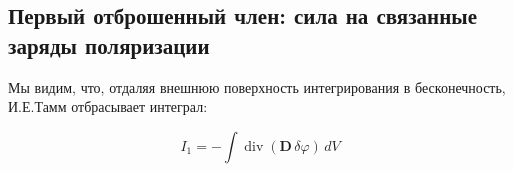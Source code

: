 \documentclass[a4paper,10pt]{article}
\newcommand{\modtext}[1]{\textcolor{modcolor}{#1}}
\newcommand{\modblock}[1]{\colorbox{modcolor!10}{\parbox{\dimexpr\linewidth-2\fboxsep}{#1}}}
\begin{document}
\modblock{

\subsection{Первый отброшенный член: сила на связанные заряды поляризации}











Мы видим, что, отдаляя внешнюю поверхность интегрирования в бесконечность, И.Е.Тамм отбрасывает интеграл:

\begin{equation}
I_1 = -\int \operatorname{div}(\mathbf{D}\,\delta\varphi)\,dV
\label{eq:discarded_term_1}
\end{equation}
}%
\end{document}

